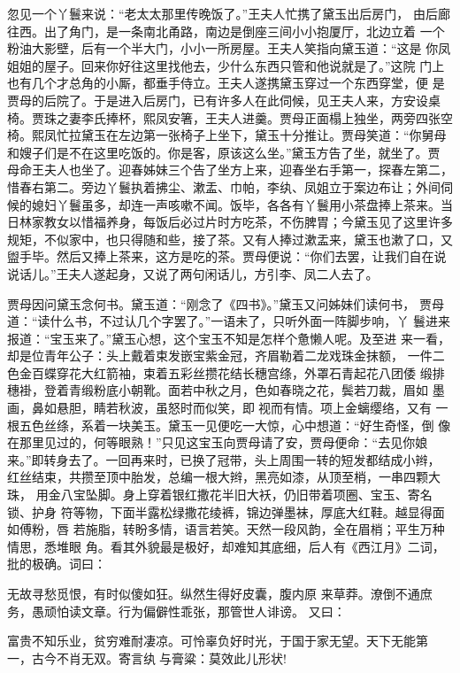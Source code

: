 忽见一个丫鬟来说：“老太太那里传晚饭了。”王夫人忙携了黛玉出后房门，
由后廊往西。出了角门，是一条南北甬路，南边是倒座三间小小抱厦厅，北边立着
一个粉油大影壁，后有一个半大门，小小一所房屋。王夫人笑指向黛玉道：“这是
你凤姐姐的屋子。回来你好往这里找他去，少什么东西只管和他说就是了。”这院
门上也有几个才总角的小厮，都垂手侍立。王夫人遂携黛玉穿过一个东西穿堂，便
是贾母的后院了。于是进入后房门，已有许多人在此伺候，见王夫人来，方安设桌
椅。贾珠之妻李氏捧杯，熙凤安箸，王夫人进羹。贾母正面榻上独坐，两旁四张空
椅。熙凤忙拉黛玉在左边第一张椅子上坐下，黛玉十分推让。贾母笑道：“你舅母
和嫂子们是不在这里吃饭的。你是客，原该这么坐。”黛玉方告了坐，就坐了。贾
母命王夫人也坐了。迎春姊妹三个告了坐方上来，迎春坐右手第一，探春左第二，
惜春右第二。旁边丫鬟执着拂尘、漱盂、巾帕，李纨、凤姐立于案边布让；外间伺
候的媳妇丫鬟虽多，却连一声咳嗽不闻。饭毕，各各有丫鬟用小茶盘捧上茶来。当
日林家教女以惜福养身，每饭后必过片时方吃茶，不伤脾胃；今黛玉见了这里许多
规矩，不似家中，也只得随和些，接了茶。又有人捧过漱盂来，黛玉也漱了口，又
盥手毕。然后又捧上茶来，这方是吃的茶。贾母便说：“你们去罢，让我们自在说
说话儿。”王夫人遂起身，又说了两句闲话儿，方引李、凤二人去了。

贾母因问黛玉念何书。黛玉道：“刚念了《四书》。”黛玉又问姊妹们读何书，
贾母道：“读什么书，不过认几个字罢了。”一语未了，只听外面一阵脚步响，丫
鬟进来报道：“宝玉来了。”黛玉心想，这个宝玉不知是怎样个惫懒人呢。及至进
来一看，却是位青年公子：头上戴着束发嵌宝紫金冠，齐眉勒着二龙戏珠金抹额，
一件二色金百蝶穿花大红箭袖，束着五彩丝攒花结长穗宫绦，外罩石青起花八团倭
缎排穗褂，登着青缎粉底小朝靴。面若中秋之月，色如春晓之花，鬓若刀裁，眉如
墨画，鼻如悬胆，睛若秋波，虽怒时而似笑，即视而有情。项上金螭缨络，又有
一根五色丝绦，系着一块美玉。黛玉一见便吃一大惊，心中想道：“好生奇怪，倒
像在那里见过的，何等眼熟！”只见这宝玉向贾母请了安，贾母便命：“去见你娘
来。”即转身去了。一回再来时，已换了冠带，头上周围一转的短发都结成小辫，
红丝结束，共攒至顶中胎发，总编一根大辫，黑亮如漆，从顶至梢，一串四颗大珠，
用金八宝坠脚。身上穿着银红撒花半旧大袄，仍旧带着项圈、宝玉、寄名锁、护身
符等物，下面半露松绿撒花绫裤，锦边弹墨袜，厚底大红鞋。越显得面如傅粉，唇
若施脂，转盼多情，语言若笑。天然一段风韵，全在眉梢；平生万种情思，悉堆眼
角。看其外貌最是极好，却难知其底细，后人有《西江月》二词，批的极确。词曰：

无故寻愁觅恨，有时似傻如狂。纵然生得好皮囊，腹内原
来草莽。潦倒不通庶务，愚顽怕读文章。行为偏僻性乖张，那管世人诽谤。
又曰：

富贵不知乐业，贫穷难耐凄凉。可怜辜负好时光，于国于家无望。天下无能第
一，古今不肖无双。寄言纨与膏粱：莫效此儿形状!

